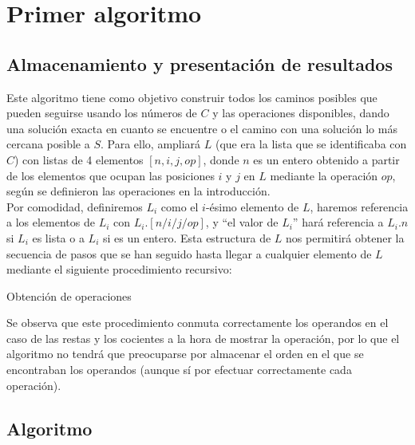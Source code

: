 \section{Primer algoritmo}

\subsection{Almacenamiento y presentación de resultados}
Este algoritmo tiene como objetivo construir todos los caminos posibles
que pueden seguirse usando los números de $C$ y las operaciones disponibles,
dando una solución exacta en cuanto se encuentre o el camino con una solución lo
más cercana posible a $S$. Para ello, ampliará $L$ (que era la lista que se
identificaba con $C$) con listas de 4 elementos $[n, i, j, op]$, donde $n$ es un
entero obtenido a partir de los elementos que ocupan las posiciones $i$ y $j$ en
$L$ mediante la operación $op$, según se definieron las operaciones en la
introducción.\\

Por comodidad,
definiremos $L_i$ como el $i$-ésimo elemento de $L$, haremos referencia a los
elementos de $L_i$ con $L_i.[n/i/j/op]$, y ``el valor de $L_i$'' hará referencia
a $L_i.n$ si $L_i$ es lista o a $L_i$ si es un entero.
Esta estructura de $L$ nos permitirá obtener la secuencia de pasos que
se han seguido hasta llegar a cualquier elemento de $L$
mediante el siguiente procedimiento recursivo:\\

\begin{algorithm}[H]
\caption{Obtención de operaciones}
\end{algorithm}

\vspace{0.4cm}

Se observa que este procedimiento conmuta correctamente los operandos en el caso
de las restas y los cocientes a la hora de mostrar la operación, por lo que el
algoritmo no tendrá que preocuparse por almacenar el orden en el que se encontraban
los operandos (aunque sí por efectuar correctamente cada operación).

\subsection{Algoritmo}

